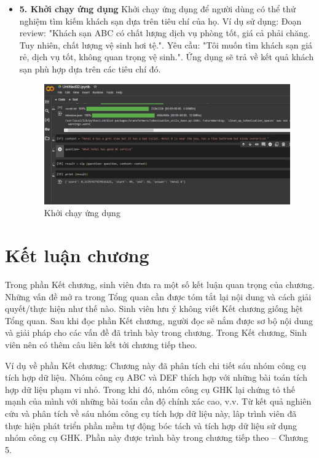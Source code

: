 \begin{itemize}
      \item \textbf{5. Khởi chạy ứng dụng} Khởi chạy ứng dụng để người dùng có thể thử nghiệm tìm kiếm khách sạn dựa trên tiêu chí của họ. Ví dụ sử dụng: Đoạn review: "Khách sạn ABC có chất lượng dịch vụ phòng tốt, giá cả phải chăng. Tuy nhiên, chất lượng vệ sinh hơi tệ.". Yêu cầu: "Tôi muốn tìm khách sạn giá rẻ, dịch vụ tốt, không quan trọng vệ sinh.". Ứng dụng sẽ trả về kết quả khách sạn phù hợp dựa trên các tiêu chí đó.

    \begin{figure}[H] %
        \centering
        \includegraphics[width=1.0\linewidth]{Figures/IMG_7847.jpeg}
        \caption{Khởi chạy ứng dụng}
        \label{fig:iot}

    \end{figure}
    
    
\end{itemize}


\section*{Kết luận chương}
Trong phần Kết chương, sinh viên đưa ra một số kết luận quan trọng của chương. Những vấn đề mở ra trong Tổng quan cần được tóm tắt lại nội dung và cách giải quyết/thực hiện như thế nào. Sinh viên lưu ý không viết Kết chương giống hệt Tổng quan. Sau khi đọc phần Kết chương, người đọc sẽ nắm được sơ bộ nội dung và giải pháp cho các vấn đề đã trình bày trong chương. Trong Kết chương, Sinh viên nên có thêm câu liên kết tới chương tiếp theo.

Ví dụ về phần Kết chương: Chương này đã phân tích chi tiết sáu nhóm công cụ tích hợp dữ liệu. Nhóm công cụ ABC và DEF thích hợp với những bài toán tích hợp dữ liệu phạm vi nhỏ. Trong khi đó, nhóm công cụ GHK lại chứng tỏ thế mạnh của mình với những bài toán cần độ chính xác cao, v.v. Từ kết quả nghiên cứu và phân tích về sáu nhóm công cụ tích hợp dữ liệu này, lâp trình viên đã thực hiện phát triển phần mềm tự động bóc tách
và tích hợp dữ liệu sử dụng nhóm công cụ GHK. Phần này được trình bày trong chương tiếp theo – Chương 5.

